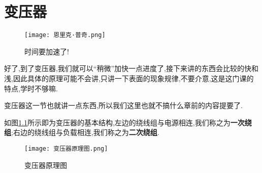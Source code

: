 \chapter{变压器}
\begin{wrapfigure}[7]{r}{0.15\textwidth}
    \centering
    \texttt{[image: 恩里克·普奇.png]}
    \caption{时间要加速了!}
\end{wrapfigure}
\Par 好了,到了变压器,我们就可以“稍微”加快一点进度了,接下来讲的东西会比较的快和浅,因此具体的原理可能不会讲,只讲一下表面的现象规律,不要介意,这是这门课的特点,学时不够嘛.

\Par 变压器这一节也就讲一点东西,所以我们这里也就不搞什么章前的内容提要了.

\Par 如图\ref{fig:变压器原理图}所示即为变压器的基本结构,左边的绕线组与电源相连,我们称之为\textbf{一次绕组};右边的绕线组与负载相连,我们称之为\textbf{二次绕组}.
\begin{figure}[htbp]
	\centering
	\texttt{[image: 变压器原理图.png]}
	\caption{变压器原理图}
	\label{fig:变压器原理图}
\end{figure}

